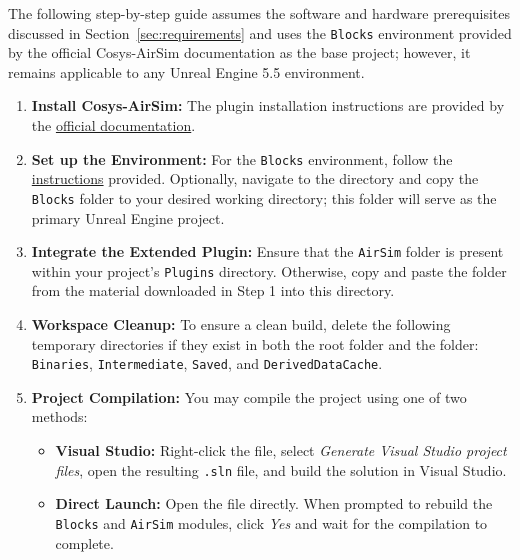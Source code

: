 The following step-by-step guide assumes the software and hardware prerequisites discussed in Section~\ref{sec:requirements} and uses the \texttt{Blocks} environment provided by the official Cosys-AirSim documentation as the base project; however, it remains applicable to any Unreal Engine 5.5 environment.

\begin{enumerate}[label=\textbf{Step \arabic*:}, leftmargin=*]
    \item \textbf{Install Cosys-AirSim:} The plugin installation instructions are provided by the \href{https://cosys-lab.github.io/Cosys-AirSim/install_windows/}{official documentation}. 
    
    \item \textbf{Set up the Environment:} For the \texttt{Blocks} environment, follow the \href{https://cosys-lab.github.io/Cosys-AirSim/unreal_blocks/}{instructions} provided. Optionally, navigate to the \texttt{} directory and copy the \texttt{Blocks} folder to your desired working directory; this folder will serve as the primary Unreal Engine project.
    
    \item \textbf{Integrate the Extended Plugin:} Ensure that the \texttt{AirSim} folder is present within your project's \texttt{Plugins} directory. Otherwise, copy and paste the folder from the material downloaded in Step 1 into this directory.
    
    \item \textbf{Workspace Cleanup:} To ensure a clean build, delete the following temporary directories if they exist in both the root folder and the \texttt{} folder: \texttt{Binaries}, \texttt{Intermediate}, \texttt{Saved}, and \texttt{DerivedDataCache}.
    
    \item \textbf{Project Compilation:} You may compile the project using one of two methods:
    \begin{itemize}
        \item \textbf{Visual Studio:} Right-click the \texttt{} file, select \textit{Generate Visual Studio project files}, open the resulting \texttt{.sln} file, and build the solution in Visual Studio.
        \item \textbf{Direct Launch:} Open the \texttt{} file directly. When prompted to rebuild the \texttt{Blocks} and \texttt{AirSim} modules, click \textit{Yes} and wait for the compilation to complete.
    \end{itemize}
    

\end{enumerate}
